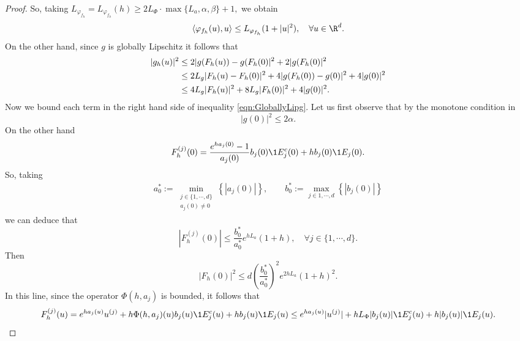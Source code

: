 \begin{proof}
	So, taking 
	$
		L_{\varphi_{f_h}} = L_{\varphi_{f_h}}(h) \geq 2 L_{\Phi} \cdot \max\{L_a, \alpha, \beta\} + 1,
	$ 
	we obtain
	\begin{equation}\label{eqn:VarphifhDotProdBound}
		\innerprod{ \varphi_{f_h}(u)}{u}
		\leq 
			L_{\varphi_{f_h}} (1+|u|^2), \quad \forall u \in \R^d.
	\end{equation}
	On the other hand, since $g$ is globally Lipschitz it follows that
	\begin{align}\label{eqn:GloballyLipg}
		|g_h(u)|^2 
		&\leq
			2 |g(F_h(u)) - g(F_h(0)|^2  + 2 | g(F_h(0)|^2 \notag \\
		&\leq 
			2 L_g |F_h(u) - F_h(0)|^2  + 4 |g(F_h(0)) - g(0)|^2 + 4 |g(0)|^2 \notag\\ 
		&\leq 
			4 L_g |F_h(u)|^2  + 8 L_g |F_h(0)|^2  + 4 |g(0)|^2 .
	\end{align}
	Now we bound each term in the right hand side of inequality \eqref{eqn:GloballyLipg}.
	Let us first observe that by the monotone condition in 
	\begin{equation} \label{eqn:Boundgzero}
		|g(0)|^2 \leq 2\alpha.
	\end{equation}
	On the other hand 
	\begin{align*}
		F_h^{(j)} (0) =
			\frac{e^{h a_j(0)}-1}{a_j(0)} b_j(0) \1{E_j^c}(0) + hb_j(0) \1{E_j}(0).
	\end{align*}
	So, taking
	\begin{align*}
		a^*_0 := 
			\min_{
				\substack{
					j \in \{1, \cdots, d \}\\
					a_j(0) \neq 0
				}
			}
			\left\{
				|a_j(0)|
			\right\},
			\qquad
		b^*_0 :=
			\max_{
				j\in {1,\cdots, d}
			}
			\left\{
				|b_j(0)|
			\right\}
	\end{align*}
	we can deduce that
	\begin{equation*}
		|F_h^{(j)}(0)| 
			\leq
			\frac{b_0^*}{a_0^*}
			e^{h L_a} (1+h),
			\quad
			\forall j \in \{1, \cdots, d\}.  
	\end{equation*}
	Then
	\begin{equation} \label{eqn:BoundFhZero}
		|F_h(0)|^2 
			\leq
			d\left(
				\frac{b_0^*}{a_0^*}
			\right)^2
		e^{2h L_a} (1+h)^2.
	\end{equation}
	In this line, since the operator $\Phi(h,a_j)$ is bounded, it follows that
	\begin{dmath*}
		F_h^{(j)}(u) 
			=
			e^{h a_j(u)} u^{(j)} +
			h \Phi(h, a_j)(u) b_j(u) \1{E_j^c}(u) +h b_j(u) \1{E_j}(u)
			\leq
			e^{h a_j(u)} |u^{(j)}| +
			h L_{\Phi} |b_j(u)| \1{E_j^c}(u) +h |b_j(u)| \1{E_j}(u).

\end{dmath*}
\end{proof}
